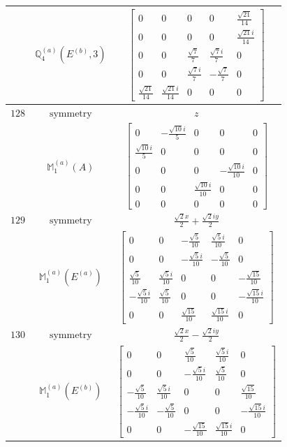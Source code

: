 \documentclass[fleqn,8pt,landscape]{jsarticle}
\begin{document}
\begin{longtable}{ccc}
$  $ & $ \mathbb{Q}_{4}^{(a)}(E^{(b)},3) $ & $ \begin{bmatrix} 0 & 0 & 0 & 0 & \frac{\sqrt{21}}{14} \\ 0 & 0 & 0 & 0 & \frac{\sqrt{21} i}{14} \\ 0 & 0 & \frac{\sqrt{7}}{7} & \frac{\sqrt{7} i}{7} & 0 \\ 0 & 0 & \frac{\sqrt{7} i}{7} & - \frac{\sqrt{7}}{7} & 0 \\ \frac{\sqrt{21}}{14} & \frac{\sqrt{21} i}{14} & 0 & 0 & 0 \end{bmatrix} $ \\ \hline
$ 128 $ & $ \text{symmetry} $ & $ z $ \\
$  $ & $ \mathbb{M}_{1}^{(a)}(A) $ & $ \begin{bmatrix} 0 & - \frac{\sqrt{10} i}{5} & 0 & 0 & 0 \\ \frac{\sqrt{10} i}{5} & 0 & 0 & 0 & 0 \\ 0 & 0 & 0 & - \frac{\sqrt{10} i}{10} & 0 \\ 0 & 0 & \frac{\sqrt{10} i}{10} & 0 & 0 \\ 0 & 0 & 0 & 0 & 0 \end{bmatrix} $ \\ \hline
$ 129 $ & $ \text{symmetry} $ & $ \frac{\sqrt{2} x}{2} + \frac{\sqrt{2} i y}{2} $ \\
$  $ & $ \mathbb{M}_{1}^{(a)}(E^{(a)}) $ & $ \begin{bmatrix} 0 & 0 & - \frac{\sqrt{5}}{10} & \frac{\sqrt{5} i}{10} & 0 \\ 0 & 0 & - \frac{\sqrt{5} i}{10} & - \frac{\sqrt{5}}{10} & 0 \\ \frac{\sqrt{5}}{10} & \frac{\sqrt{5} i}{10} & 0 & 0 & - \frac{\sqrt{15}}{10} \\ - \frac{\sqrt{5} i}{10} & \frac{\sqrt{5}}{10} & 0 & 0 & - \frac{\sqrt{15} i}{10} \\ 0 & 0 & \frac{\sqrt{15}}{10} & \frac{\sqrt{15} i}{10} & 0 \end{bmatrix} $ \\ \hline
$ 130 $ & $ \text{symmetry} $ & $ \frac{\sqrt{2} x}{2} - \frac{\sqrt{2} i y}{2} $ \\
$  $ & $ \mathbb{M}_{1}^{(a)}(E^{(b)}) $ & $ \begin{bmatrix} 0 & 0 & \frac{\sqrt{5}}{10} & \frac{\sqrt{5} i}{10} & 0 \\ 0 & 0 & - \frac{\sqrt{5} i}{10} & \frac{\sqrt{5}}{10} & 0 \\ - \frac{\sqrt{5}}{10} & \frac{\sqrt{5} i}{10} & 0 & 0 & \frac{\sqrt{15}}{10} \\ - \frac{\sqrt{5} i}{10} & - \frac{\sqrt{5}}{10} & 0 & 0 & - \frac{\sqrt{15} i}{10} \\ 0 & 0 & - \frac{\sqrt{15}}{10} & \frac{\sqrt{15} i}{10} & 0 \end{bmatrix} $ \\ \hline

\end{longtable}
\end{document}
